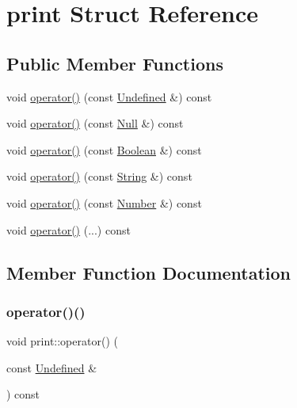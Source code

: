 \hypertarget{structprint}{}\section{print Struct Reference}
\label{structprint}
\subsection*{Public Member Functions}
\begin{DoxyCompactItemize}
\item 
void \hyperlink{structprint_af1ec004446fc307cd4a4c33686c54968}{operator()} (const \hyperlink{struct_undefined}{Undefined} \&) const
\item 
void \hyperlink{structprint_a2bfbb1fdbdf18b45f220d0cd59a607b0}{operator()} (const \hyperlink{struct_null}{Null} \&) const
\item 
void \hyperlink{structprint_ac97af64f9a0d3c3a183e328ea6751c0b}{operator()} (const \hyperlink{struct_boolean}{Boolean} \&) const
\item 
void \hyperlink{structprint_abb6325040508ed7eeef1e43beb5c03d7}{operator()} (const \hyperlink{struct_string}{String} \&) const
\item 
void \hyperlink{structprint_ae4c5756e35f640e4a1af7a35bae86bcf}{operator()} (const \hyperlink{struct_number}{Number} \&) const
\item 
void \hyperlink{structprint_a9a42d574398b55c09bf3439a5a9aa33a}{operator()} (...) const
\end{DoxyCompactItemize}


\subsection{Member Function Documentation}
\mbox{\label{structprint_af1ec004446fc307cd4a4c33686c54968}} 
\subsubsection{\texorpdfstring{operator()()}{operator()()}\hspace{0.1cm}{\footnotesize\ttfamily [1/6]}}
{\footnotesize\ttfamily void print\+::operator() (\begin{DoxyParamCaption}\item[{const \hyperlink{struct_undefined}{Undefined} \&}]{ }\end{DoxyParamCaption}) const\hspace{0.3cm}{\ttfamily [inline]}}

